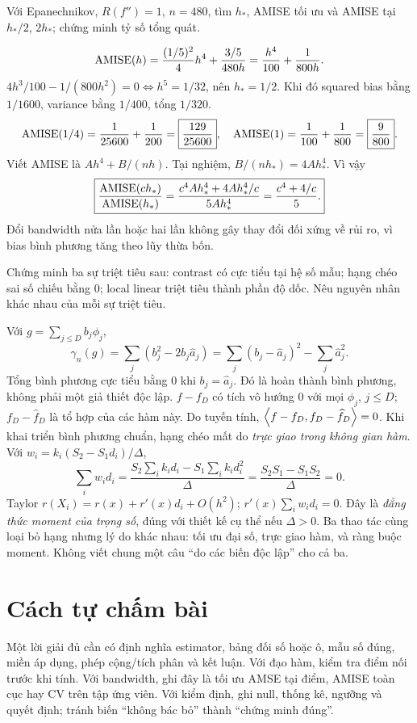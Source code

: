 \begin{exercise}
Với Epanechnikov, $R(f'')=1$, $n=480$, tìm $h_*$, AMISE tối ưu và
AMISE tại $h_*/2$, $2h_*$; chứng minh tỷ số tổng quát.
\end{exercise}
\begin{solution}
\[
\operatorname{AMISE}(h)=\frac{(1/5)^2}{4}h^4+\frac{3/5}{480h}
=\frac{h^4}{100}+\frac1{800h}.
\]
$4h^3/100-1/(800h^2)=0\iff h^5=1/32$, nên
$\boxed{h_*=1/2}$. Khi đó squared bias bằng $1/1600$,
variance bằng $1/400$, tổng $\boxed{1/320}$.
\[
\operatorname{AMISE}(1/4)=\frac1{25600}+\frac1{200}
=\boxed{\frac{129}{25600}},\quad
\operatorname{AMISE}(1)=\frac1{100}+\frac1{800}=\boxed{\frac9{800}}.
\]
Viết AMISE là $Ah^4+B/(nh)$. Tại nghiệm,
$B/(nh_*)=4Ah_*^4$. Vì vậy
\[
\boxed{\frac{\operatorname{AMISE}(ch_*)}{\operatorname{AMISE}(h_*)}
=\frac{c^4Ah_*^4+4Ah_*^4/c}{5Ah_*^4}
=\frac{c^4+4/c}{5}.}
\]
Đổi bandwidth nửa lần hoặc hai lần không gây thay đổi đối xứng về rủi ro,
vì bias bình phương tăng theo lũy thừa bốn.
\end{solution}

\begin{exercise}
Chứng minh ba sự triệt tiêu sau: contrast có cực tiểu tại hệ số mẫu;
hạng chéo sai số chiếu bằng 0; local linear triệt tiêu thành phần độ dốc.
Nêu nguyên nhân khác nhau của mỗi sự triệt tiêu.
\end{exercise}
\begin{solution}
Với $g=\sum_{j\leq D}b_j\phi_j$,
\[
\gamma_n(g)=\sum_j(b_j^2-2b_j\widehat a_j)
=\sum_j(b_j-\widehat a_j)^2-\sum_j\widehat a_j^2.
\]
Tổng bình phương cực tiểu bằng 0 khi $b_j=\widehat a_j$.
Đó là hoàn thành bình phương, không phải một giả thiết độc lập.
$f-f_D$ có tích vô hướng 0 với mọi $\phi_j$, $j\leq D$;
$f_D-\widehat f_D$ là tổ hợp của các hàm này. Do tuyến tính,
$\left\langle f-f_D,f_D-\widehat f_D\right\rangle=0$. Khi khai triển bình phương chuẩn,
hạng chéo mất do \emph{trực giao trong không gian hàm}.
Với $w_i=k_i(S_2-S_1d_i)/\Delta$,
\[
\sum_iw_id_i=\frac{S_2\sum_i k_id_i-S_1\sum_i k_id_i^2}{\Delta}
=\frac{S_2S_1-S_1S_2}{\Delta}=0.
\]
Taylor $r(X_i)=r(x)+r'(x)d_i+O(h^2)$;
$r'(x)\sum_iw_id_i=0$. Đây là \emph{đẳng thức moment của trọng số},
đúng với thiết kế cụ thể nếu $\Delta>0$.
Ba thao tác cùng loại bỏ hạng nhưng lý do khác nhau: tối ưu đại số,
trực giao hàm, và ràng buộc moment. Không viết chung một câu
``do các biến độc lập'' cho cả ba.
\end{solution}

\section{Cách tự chấm bài}
Một lời giải đủ cần có định nghĩa estimator, bảng đối số hoặc ô, mẫu số
đúng, miền áp dụng, phép cộng/tích phân và kết luận.
Với đạo hàm, kiểm tra điểm nối trước khi tính.
Với bandwidth, ghi đây là tối ưu AMSE tại điểm, AMISE toàn cục hay CV
trên tập ứng viên. Với kiểm định, ghi null, thống kê, ngưỡng và quyết
định; tránh biến ``không bác bỏ'' thành ``chứng minh đúng''.
